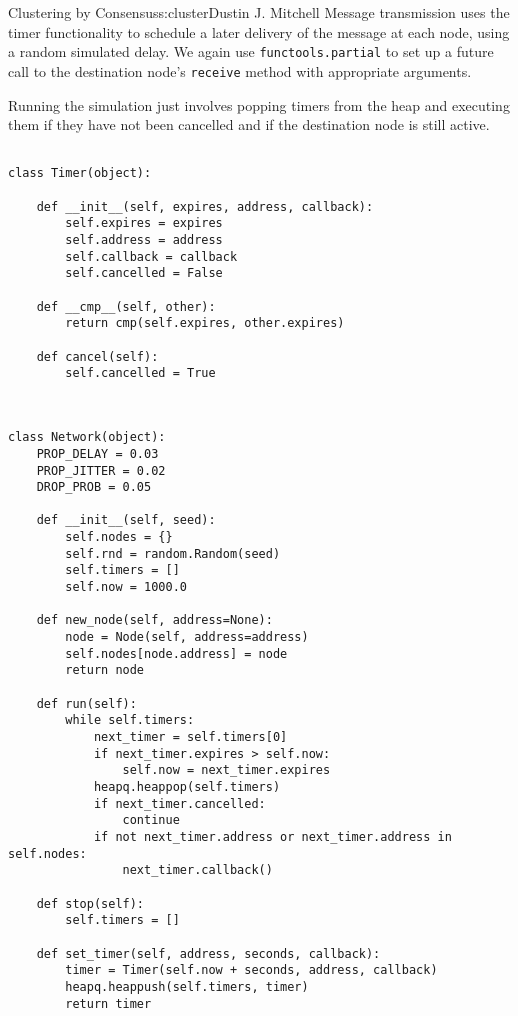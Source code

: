 \begin{aosachapter}{Clustering by Consensus}{s:cluster}{Dustin J. Mitchell}
Message transmission uses the timer functionality to schedule a later
delivery of the message at each node, using a random simulated delay. We
again use \texttt{functools.partial} to set up a future call to the
destination node's \texttt{receive} method with appropriate arguments.

Running the simulation just involves popping timers from the heap and
executing them if they have not been cancelled and if the destination
node is still active.

\begin{verbatim}

class Timer(object):

    def __init__(self, expires, address, callback):
        self.expires = expires
        self.address = address
        self.callback = callback
        self.cancelled = False

    def __cmp__(self, other):
        return cmp(self.expires, other.expires)

    def cancel(self):
        self.cancelled = True
    
\end{verbatim}

\begin{verbatim}

class Network(object):
    PROP_DELAY = 0.03
    PROP_JITTER = 0.02
    DROP_PROB = 0.05

    def __init__(self, seed):
        self.nodes = {}
        self.rnd = random.Random(seed)
        self.timers = []
        self.now = 1000.0

    def new_node(self, address=None):
        node = Node(self, address=address)
        self.nodes[node.address] = node
        return node

    def run(self):
        while self.timers:
            next_timer = self.timers[0]
            if next_timer.expires > self.now:
                self.now = next_timer.expires
            heapq.heappop(self.timers)
            if next_timer.cancelled:
                continue
            if not next_timer.address or next_timer.address in self.nodes:
                next_timer.callback()

    def stop(self):
        self.timers = []

    def set_timer(self, address, seconds, callback):
        timer = Timer(self.now + seconds, address, callback)
        heapq.heappush(self.timers, timer)
        return timer


\end{verbatim}
\end{aosachapter}
